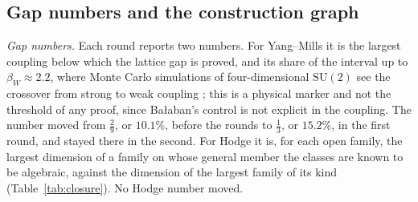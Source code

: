 \subsection{Gap numbers and the construction graph}\label{ssec:gapnumbers}

\emph{Gap numbers.} Each round reports two numbers. For Yang--Mills it is the largest coupling below which the lattice gap is proved, and its share of the interval up to $\beta_{W}\approx2.2$, where Monte Carlo simulations of four-dimensional $\mathrm{SU}(2)$ see the crossover from strong to weak coupling \cite{Cre80}; this is a physical marker and not the threshold of any proof, since Ba{\l}aban's control is not explicit in the coupling. The number moved from $\frac29$, or $10.1\%$, before the rounds to $\frac13$, or $15.2\%$, in the first round, and stayed there in the second. For Hodge it is, for each open family, the largest dimension of a family on whose general member the classes are known to be algebraic, against the dimension of the largest family of its kind (Table~\ref{tab:closure}). No Hodge number moved.

